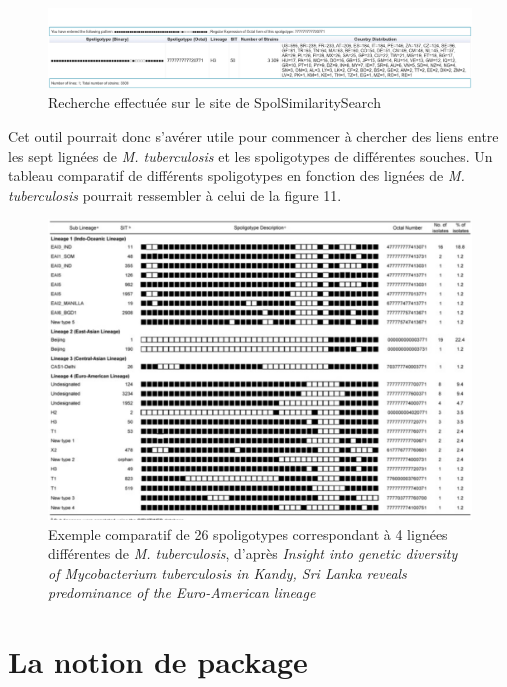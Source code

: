 \documentclass[twoside,a4paper,11pt,frenchb,openany]{report}
\begin{document}
\begin{figure}[h!]
\centering
\includegraphics[scale=0.37]{spolsimilarity.png}
\caption{Recherche effectuée sur le site de SpolSimilaritySearch}
\end{figure}

Cet outil pourrait donc s'avérer utile pour commencer à chercher des liens entre les sept lignées de \textit{M. tuberculosis} et les spoligotypes de différentes souches.
Un tableau comparatif de différents spoligotypes en fonction des lignées de \textit{M. tuberculosis} pourrait ressembler à celui de la figure 11.

\begin{figure}[h!]
\centering
\includegraphics[scale=0.4]{comparaison.png}
\caption{Exemple comparatif de 26 spoligotypes correspondant à 4 lignées différentes de \textit{M. tuberculosis}, d'après \textit{Insight into genetic diversity of Mycobacterium tuberculosis in Kandy, Sri Lanka reveals predominance of the Euro-American lineage}}
\end{figure}
	


\chapter{La notion de package}
\end{document}
